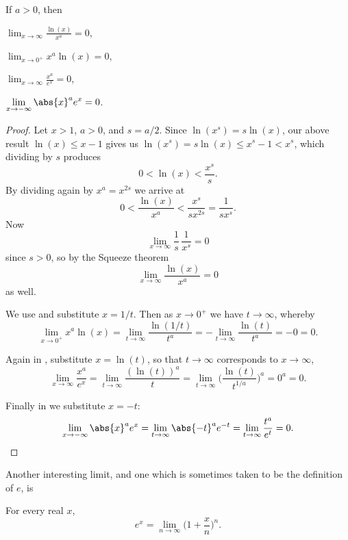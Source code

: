 \begin{theorem}
	If $a > 0$, then
	\begin{romanlist}
		\item $\displaystyle \lim_{x \to \infty} \frac{\ln(x)}{x^a} = 0$,
		\item $\displaystyle \lim_{x \to 0^+} x^a \ln(x) = 0$,
		\item $\displaystyle \lim_{x \to \infty} \frac{x^a}{e^x} = 0$,
		\item $\displaystyle \lim_{x \to -\infty} \abs{x}^a e^x = 0$.
	\end{romanlist}
\end{theorem}

\begin{proof}
	 Let $x > 1$, $a > 0$, and $s = a / 2$.
	Since $\ln(x^s) = s \ln(x)$, our above result $\ln(x) \leq x - 1$ gives us $\ln(x^s) = s \ln(x) \leq x^s - 1 < x^s$, which dividing by $s$ produces
	\[
		0 < \ln(x) < \frac{x^s}{s}.
	\]
	By dividing again by $x^a = x^{2 s}$ we arrive at
	\[
		0 < \frac{\ln(x)}{x^a} < \frac{x^s}{s x^{2 s}} = \frac{1}{s x^s}.
	\]
	Now
	\[
		\lim_{x \to \infty} \frac{1}{s} \, \frac{1}{x^s} = 0
	\]
	since $s > 0$, so by the Squeeze theorem
	\[
		\lim_{x \to \infty} \frac{\ln(x)}{x^a} = 0
	\]
	as well.

	 We use  and substitute $x = 1/t$.
	Then as $x \to 0^+$ we have $t \to \infty$, whereby
	\[
		\lim_{x \to 0^+} x^a \ln(x) = \lim_{t \to \infty} \frac{\ln(1 / t)}{t^a} = - \lim_{t \to \infty} \frac{\ln(t)}{t^a} = -0 = 0.
	\]

	\noindent
	 Again in , substitute $x = \ln(t)$, so that $t \to \infty$ corresponds to $x \to \infty$,
	\[
		\lim_{x \to \infty} \frac{x^a}{e^x} = \lim_{t \to \infty} \frac{(\ln(t))^a}{t} = \lim_{t \to \infty} \Big ( \frac{\ln(t)}{t^{1/a}} \Big ) ^a = 0^a = 0.
	\]

	\noindent
	 Finally in  we substitute $x = -t$:
	\[
		\lim_{x \to -\infty} \abs{x}^a e^x = \lim_{t \to \infty} \abs{- t}^a e^{-t} = \lim_{t \to \infty} \frac{t^a}{e^t} = 0. \qedhere
	\]
\end{proof}

\noindent
Another interesting limit, and one which is sometimes taken to be the definition of $e$, is
\begin{theorem}
	For every real $x$,
	\[
		e^x = \lim_{n \to \infty} \Big ( 1 + \frac{x}{n} \Big )^n.
	\]
\end{theorem}

